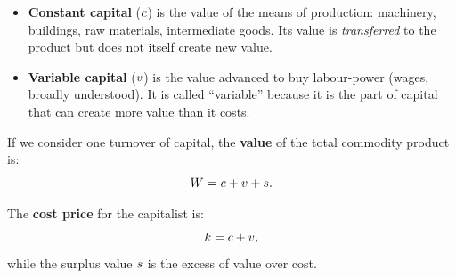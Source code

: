 \begin{itemize}[leftmargin=1.5em]
  \item \textbf{Constant capital} ($c$) is the value of the means of
  production: machinery, buildings, raw materials, intermediate goods.
  Its value is \emph{transferred} to the product but does not itself create
  new value.
  \item \textbf{Variable capital} ($v$) is the value advanced to buy
  labour-power (wages, broadly understood). It is called ``variable'' because
  it is the part of capital that can create more value than it costs.
\end{itemize}

If we consider one turnover of capital, the \textbf{value} of the total
commodity product is:
\begin{equation}
  W = c + v + s.
  \label{eq:total-value}
\end{equation}

The \textbf{cost price} for the capitalist is:
\begin{equation}
  k = c + v,
\end{equation}
while the surplus value $s$ is the excess of value over cost.


